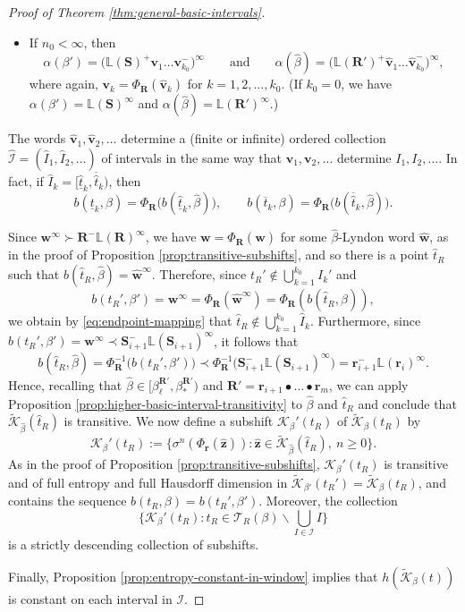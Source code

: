\documentclass[11pt]{amsart}
\theoremstyle{definition}
\theoremstyle{remark}
\numberwithin{equation}{section}
\renewcommand{\L}{\ensuremath{\mathbb{L}}}
\newcommand{\II}{\mathcal{I}}
\newcommand{\Kt}{\widetilde{\mathcal{K}}}
\newcommand{\bR}{\mathbf{R}}
\newcommand{\cs}{ {\mathbf{S}}}
\renewcommand{\r}{ {\mathbf{r}}}
\renewcommand{\v}{\mathbf{v}}
\newcommand{\w}{\mathbf{w}}
\newcommand{\z}{\mathbf{z}}
\newcommand{\f}{\infty}
\newcommand{\al}{\alpha}
\begin{document}
\begin{proof}[Proof of Theorem \ref{thm:general-basic-intervals}]
\begin{itemize}
\item If $n_0<\f$, then 
\[
\al(\beta')=\big(\L(\cs)^+\v_1\dots\v_{k_0}^-\big)^\f \qquad\mbox{and} \qquad \al(\hat{\beta})=\big(\L(\bR')^+\hat{\v}_1\dots\hat{\v}_{k_0}^-\big)^\f, 
\]
where again, $\v_k=\Phi_\bR(\hat{\v}_k)$ for $k=1,2,\dots,k_0$. (If $k_0=0$, we have $\al(\beta')=\L(\cs)^\f$ and $\al(\hat{\beta})=\L(\bR')^\f$.)
\end{itemize}

The words $\hat{\v}_1,\hat{\v}_2,\dots$ determine a (finite or infinite) ordered collection $\widehat{\II}=(\hat{I}_1,\hat{I}_2,\dots)$ of intervals in the same way that $\v_1,\v_2,\dots$ determine $I_1,I_2,\dots$. In fact, if $\hat{I}_k=[\underline{\hat{t}}_k,\overline{\hat{t}}_k)$, then
\begin{equation} \label{eq:endpoint-mapping}
b(\underline{t}_k,\beta)=\Phi_\bR\big(b(\underline{\hat{t}}_k,\hat{\beta})\big), \qquad b(\overline{t}_k,\beta)=\Phi_\bR\big(b(\overline{\hat{t}}_k,\hat{\beta})\big).
\end{equation}

Since $\w^\f\succ \bR^-\L(\bR)^\f$, we have $\w=\Phi_\bR(\hat{\w})$ for some $\hat{\beta}$-Lyndon word $\hat{\w}$, as in the proof of Proposition \ref{prop:transitive-subshifts}, and so there is a point $\hat{t}_R$ such that $b(\hat{t}_R,\hat{\beta})=\hat{\w}^\f$. Therefore, since $t_R'\not\in \bigcup_{k=1}^{k_0}I_k'$ and 
\[
b(t_R',\beta')=\w^\f=\Phi_\bR(\hat{\w}^\f)=\Phi_\bR(b(\hat{t}_R,\hat{\beta})), 
\]
we obtain by \eqref{eq:endpoint-mapping} that $\hat{t}_R\not\in\bigcup_{k=1}^{k_0}\hat{I}_k$. Furthermore, since $b(t_R',\beta')=\w^\f\prec \cs_{i+1}^-\L(\cs_{i+1})^\f$, it follows that
\[
b(\hat{t}_R,\hat{\beta})=\Phi_{\bR}^{-1}\big(b(t_R',\beta')\big)\prec \Phi_{\bR}^{-1}\big(\cs_{i+1}^-\L(\cs_{i+1})^\f\big)=\r_{i+1}^-\L(\r_i)^\f.
\]
{Hence, recalling that $\hat{\beta}\in [\beta_\ell^{\bR'},\beta_*^{\bR'})$ and $\bR'=\r_{i+1}\bullet\dots\bullet\r_m$, we can apply Proposition \ref{prop:higher-basic-interval-transitivity} to $\hat{\beta}$ {and $\hat{t}_R$} and conclude that} $\Kt_{\hat\beta}(\hat{t}_R)$ is transitive. We now define a subshift $\mathcal{K}_\beta'(t_R)$ of $\Kt_\beta(t_R)$ by
\[
\mathcal{K}_\beta'(t_R):=\{\sigma^n(\Phi_{\r}(\hat{\z})): \hat{\z}\in \Kt_{\hat\beta}(\hat{t}_R),\ n\geq 0\}.
\]
As in the proof of Proposition \ref{prop:transitive-subshifts}, $\mathcal{K}_\beta'(t_R)$ is transitive and of full entropy and full Hausdorff dimension in $\Kt_{\beta'}(t_R')=\Kt_\beta(t_R)$, and contains the sequence $b(t_R,\beta)=b(t_R',\beta')$. Moreover, the collection
\[
\{\mathcal{K}_\beta'(t_R): t_R\in\mathcal{T}_R(\beta)\backslash \textstyle{\bigcup_{I\in\II}I}\}
\]
is a strictly descending collection of subshifts.

Finally, Proposition \ref{prop:entropy-constant-in-window} implies that $h(\Kt_\beta(t))$ is constant on each interval in $\II$.
\end{proof}
\end{document}
